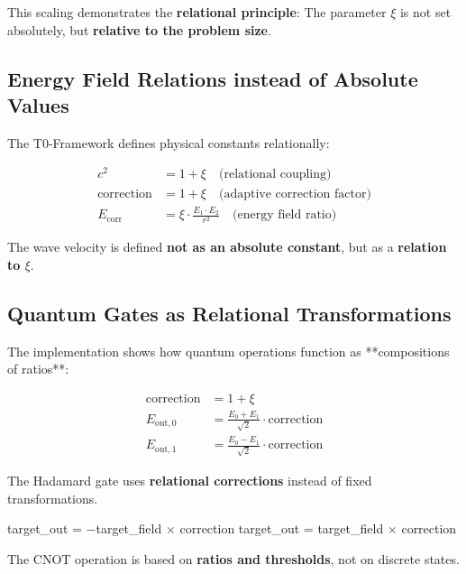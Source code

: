 	This scaling demonstrates the \textbf{relational principle}: The parameter $\xi$ is not set absolutely, but \textbf{relative to the problem size}.
	
	\subsection{Energy Field Relations instead of Absolute Values}
	
	The T0-Framework defines physical constants relationally:
	
	\begin{align}
		c^2 &= 1 + \xi \quad \text{(relational coupling)} \\
		\text{correction} &= 1 + \xi \quad \text{(adaptive correction factor)} \\
		E_{\text{corr}} &= \xi \cdot \frac{E_1 \cdot E_2}{r^2} \quad \text{(energy field ratio)}
	\end{align}
	
	The wave velocity is defined \textbf{not as an absolute constant}, but as a \textbf{relation to $\xi$}.
	
	\subsection{Quantum Gates as Relational Transformations}
	
	The implementation shows how quantum operations function as **compositions of ratios**:
	
	\begin{example}
		\begin{align}
			\text{correction} &= 1 + \xi \\
			E_{\text{out},0} &= \frac{E_0 + E_1}{\sqrt{2}} \cdot \text{correction} \\
			E_{\text{out},1} &= \frac{E_0 - E_1}{\sqrt{2}} \cdot \text{correction}
		\end{align}
		
		The Hadamard gate uses \textbf{relational corrections} instead of fixed transformations.
	\end{example}
	
	\begin{example}
		\begin{algorithmic}[1]
			\STATE target\_out = $-$target\_field $\times$ correction
			\ELSE
			\STATE target\_out = target\_field $\times$ correction
			\ENDIF
		\end{algorithmic}
		
		The CNOT operation is based on \textbf{ratios and thresholds}, not on discrete states.
	\end{example}
	
